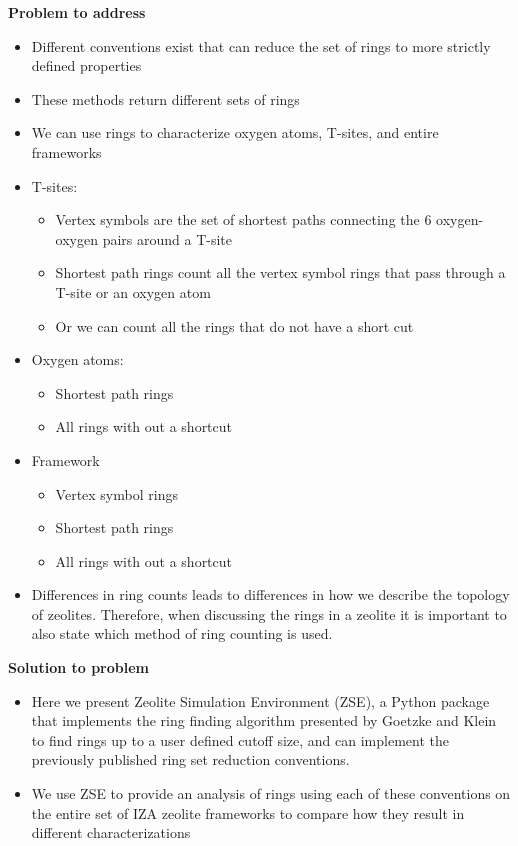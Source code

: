 \documentclass[11pt]{article}
\begin{document}
\textbf{\textbf{Problem to address}}
\begin{itemize}
\item Different conventions exist that can reduce the set of rings to more strictly defined properties
\item These methods return different sets of rings
\item We can use rings to characterize oxygen atoms, T-sites, and entire frameworks
\item T-sites:
\begin{itemize}
\item Vertex symbols are the set of shortest paths connecting the 6 oxygen-oxygen pairs around a T-site \cite{okeeffe-vertex-1997}
\item Shortest path rings count all the vertex symbol rings that pass through a T-site or an oxygen atom \cite{sastre-topological-2009}
\item Or we can count all the rings that do not have a short cut \cite{goetzke-properties-1991}
\end{itemize}
\item Oxygen atoms:
\begin{itemize}
\item Shortest path rings
\item All rings with out a shortcut
\end{itemize}
\item Framework
\begin{itemize}
\item Vertex symbol rings
\item Shortest path rings
\item All rings with out a shortcut
\end{itemize}
\item Differences in ring counts leads to differences in how we describe the topology of zeolites. Therefore, when discussing the rings in a zeolite it is important to also state which method of ring counting is used.
\end{itemize}

\textbf{\textbf{Solution to problem}}
\begin{itemize}
\item Here we present Zeolite Simulation Environment (ZSE), a Python package that implements the ring finding algorithm presented by Goetzke and Klein \cite{goetzke-properties-1991} to find rings up to a user defined cutoff size, and can implement the previously published ring set reduction conventions.
\item We use ZSE to provide an analysis of rings using each of these conventions on the entire set of IZA zeolite frameworks to compare how they result in different characterizations
\end{itemize}
\end{document}
